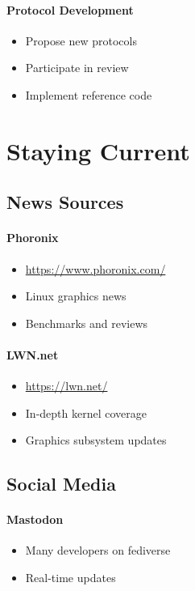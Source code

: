 \paragraph{Protocol Development}
\begin{itemize}
    \item Propose new protocols
    \item Participate in review
    \item Implement reference code
\end{itemize}

\section{Staying Current}

\subsection{News Sources}

\paragraph{Phoronix}
\begin{itemize}
    \item \url{https://www.phoronix.com/}
    \item Linux graphics news
    \item Benchmarks and reviews
\end{itemize}

\paragraph{LWN.net}
\begin{itemize}
    \item \url{https://lwn.net/}
    \item In-depth kernel coverage
    \item Graphics subsystem updates
\end{itemize}

\subsection{Social Media}

\paragraph{Mastodon}
\begin{itemize}
    \item Many developers on fediverse
    \item Real-time updates
\end{itemize}

